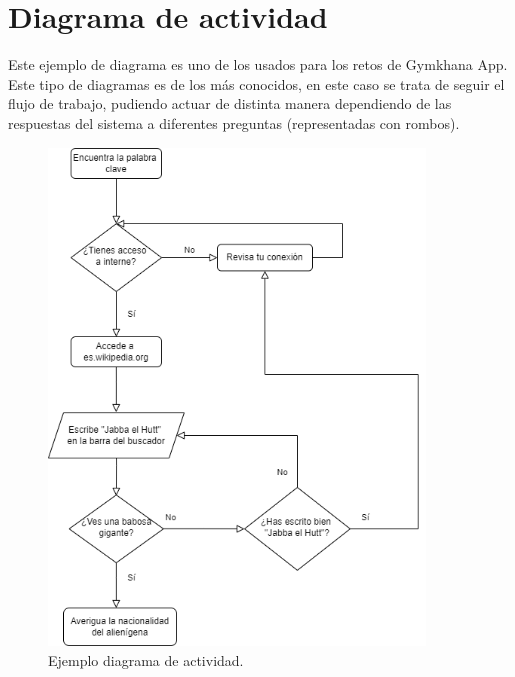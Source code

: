 \documentclass[a4paper, 12pt]{book}
\begin{document}
\section{Diagrama de actividad}
Este ejemplo de diagrama es uno de los usados para los retos de Gymkhana App. Este tipo de diagramas es de los más conocidos, en este caso se trata de seguir el flujo de trabajo, pudiendo actuar de distinta manera dependiendo de las respuestas del sistema a diferentes preguntas (representadas con rombos). 
\begin{figure}
	\centering
	\includegraphics[width=10cm, keepaspectratio]{img/diagrama_actividad.png}
	\caption{Ejemplo diagrama de actividad.}\label{fig:diiagrama_actividad}
\end{figure}
\end{document}
